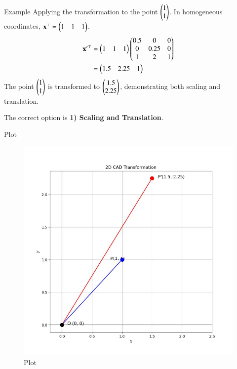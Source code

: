 \documentclass{beamer}
\begin{document}
\begin{frame}{Example}
Applying the transformation to the point $\begin{pmatrix}1 \\ 1\end{pmatrix}$. In homogeneous coordinates, $\mathbf{x}^\top = \begin{pmatrix}1 & 1 & 1\end{pmatrix}$.
\begin{align*}
    \mathbf{x}'^\top &= \begin{pmatrix}1 & 1 & 1\end{pmatrix} \begin{pmatrix}0.5 & 0 & 0 \\ 0 & 0.25 & 0 \\ 1 & 2 & 1\end{pmatrix} \\
    &= \begin{pmatrix}1.5 & 2.25 & 1\end{pmatrix}
\end{align*}
The point $\begin{pmatrix}1 \\ 1\end{pmatrix}$ is transformed to $\begin{pmatrix}1.5 \\ 2.25\end{pmatrix}$, demonstrating both scaling and translation.

The correct option is \textbf{1) Scaling and Translation}.
\end{frame}

\begin{frame}{Plot}
\begin{figure}
    \centering
    \includegraphics[width=0.5\columnwidth]{../figs/plot_p.jpg}
    \caption{Plot}
    \label{fig:fig}
\end{figure}
\end{frame}
\end{document}
